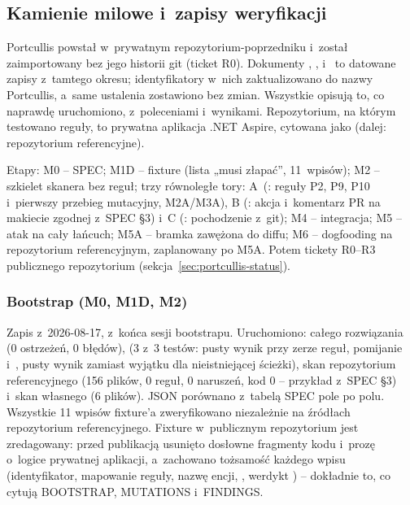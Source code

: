 \subsection{Kamienie milowe i~zapisy weryfikacji}\label{sec:portcullis-bootstrap}

Portcullis powstał w~prywatnym repozytorium-poprzedniku i~został zaimportowany bez jego
historii git (ticket R0). Dokumenty , ,
 i~ to datowane zapisy z~tamtego okresu; identyfikatory
w~nich zaktualizowano do nazwy Portcullis, a~same ustalenia zostawiono bez zmian. Wszystkie
opisują to, co naprawdę uruchomiono, z~poleceniami i~wynikami. Repozytorium, na którym
testowano reguły, to prywatna aplikacja .NET Aspire, cytowana jako 
(dalej: repozytorium referencyjne).

Etapy: M0 -- SPEC; M1D -- fixture  (lista „musi
złapać”, 11~wpisów); M2 -- szkielet skanera bez reguł; trzy równoległe tory: A~(: reguły P2, P9, P10 i~pierwszy przebieg mutacyjny, M2A/M3A),
B (: akcja i~komentarz PR na makiecie zgodnej z~SPEC §3) i~C
(: pochodzenie z~git); M4 -- integracja; M5 -- atak na cały
łańcuch; M5A -- bramka zawężona do diffu; M6 -- dogfooding na repozytorium referencyjnym,
zaplanowany po M5A. Potem tickety R0--R3 publicznego repozytorium
(sekcja~\ref{sec:portcullis-status}).

\subsubsection{Bootstrap (M0, M1D, M2)}

Zapis z~2026-08-17, z~końca sesji bootstrapu. Uruchomiono:  całego
rozwiązania (0 ostrzeżeń, 0 błędów),  (3 z~3 testów: pusty wynik przy
zerze reguł, pomijanie  i~, pusty wynik zamiast wyjątku dla
nieistniejącej ścieżki), skan repozytorium referencyjnego (156 plików, 0 reguł, 0 naruszeń,
kod 0 -- przykład z~SPEC §3) i~skan własnego  (6 plików). JSON porównano
z~tabelą SPEC pole po polu. Wszystkie 11 wpisów fixture'a zweryfikowano niezależnie na
źródłach repozytorium referencyjnego. Fixture w~publicznym repozytorium jest zredagowany:
przed publikacją usunięto dosłowne fragmenty kodu i~prozę o~logice prywatnej aplikacji,
a~zachowano tożsamość każdego wpisu (identyfikator, mapowanie reguły, nazwę encji,
, werdykt ) -- dokładnie to, co cytują
BOOTSTRAP, MUTATIONS i~FINDINGS.

